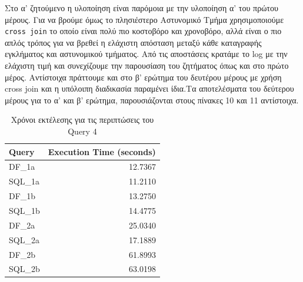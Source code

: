\documentclass{article}
\begin{document}
Στο α' ζητούμενο η υλοποίηση είναι παρόμοια με την υλοποίηση α' του πρώτου μέρους. Για να βρούμε όμως το πλησιέστερο Αστυνομικό Τμήμα χρησιμοποιούμε \texttt{cross join}  το οποίο είναι πολύ πιο κοστοβόρο και χρονοβόρο, αλλά είναι ο πιο απλός τρόπος για να βρεθεί η ελάχιστη απόσταση μεταξύ κάθε καταγραφής εγκλήματος και αστυνομικού τμήματος. Από τις αποστάσεις κρατάμε το log  με την ελάχιστη τιμή και συνεχίζουμε την παρουσίαση του ζητήματος όπως και στο πρώτο μέρος. Αντίστοιχα πράττουμε και στο β' ερώτημα του δευτέρου μέρους με χρήση  cross join  και η υπόλοιπη διαδικασία παραμένει ίδια.Τα αποτελέσματα του δεύτερου μέρους για το α' και β' ερώτημα, παρουσιάζονται στους πίνακες 10 και 11 αντίστοιχα.\\






\clearpage
{}
\begin{table}[ht]
\centering
\begin{tabular}{|l|r|}
\hline
\textbf{Query}      & \textbf{Execution Time (seconds)} \\ \hline
DF\_1a        & 12.7367                           \\ \hline
SQL\_1a       & 11.2110                           \\ \hline
DF\_1b        & 13.2750                           \\ \hline
SQL\_1b       & 14.4775                           \\ \hline
DF\_2a        & 25.0340                           \\ \hline
SQL\_2a       & 17.1889                           \\ \hline
DF\_2b        & 61.8993                           \\ \hline
SQL\_2b       & 63.0198                           \\ \hline
\end{tabular}
\caption{Χρόνοι εκτέλεσης για τις περιπτώσεις του  Query 4}
\label{table:query4_execution_times}
\end{table}
\end{document}
